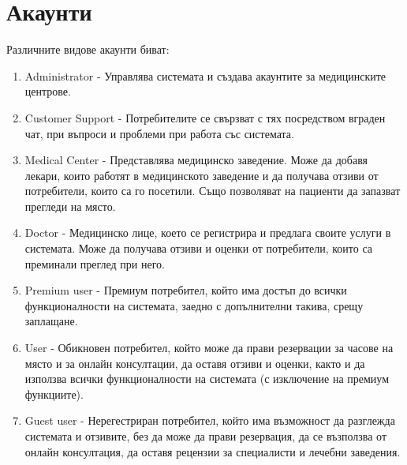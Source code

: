 \documentclass[a4paper,12pt]{article}
\begin{document}
\section{Акаунти}
Различните видове акаунти биват:
\begin{enumerate}
\item Administrator - Управлява системата и създава акаунтите за медицинските центрове.
  \item Customer Support - Потребителите се свързват с тях посредством вграден чат, при въпроси и проблеми при работа със системата.
  \item Medical Center - Представлява медицинско заведение. Може да добавя лекари, които работят в медицинското заведение и да получава отзиви от потребители, които са го посетили. Също позволяват на пациенти да запазват прегледи на място.
  \item Doctor - Медицинско лице, което се регистрира и предлага своите услуги в системата. Може да получава отзиви и оценки от потребители, които са преминали преглед при него.
  \item Premium user - Премиум потребител, който има достъп до всички функционалности на системата, заедно с допълнителни такива, срещу заплащане.
  \item User - Обикновен потребител, който може да прави резервации за часове на място и за онлайн консултации, да оставя отзиви и оценки, както и да използва всички функционалности на системата (с изключение на премиум функциите).
  \item Guest user - Нерегестриран потребител, който има възможност да разглежда системата и отзивите, без да може да прави резервация, да се възползва от онлайн консултация, да оставя рецензии за специалисти и лечебни заведения.
\end{enumerate}
\end{document}
